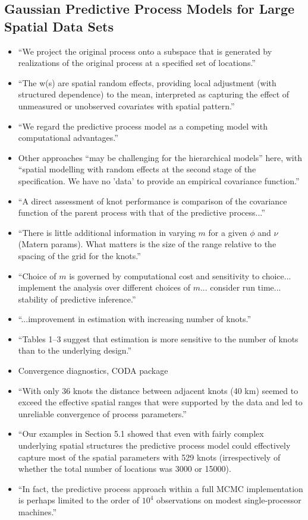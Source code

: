 \documentclass{article}
\begin{document}
\subsection*{Gaussian Predictive Process Models for Large Spatial Data Sets}
\citep{Banerjee2008}
\begin{itemize}
\item ``We project the original process onto a subspace that is generated by realizations of the original process at a specified set of locations.''
\item ``The w(s) are spatial random effects, providing local adjustment (with structured dependence) to the mean, interpreted as capturing the effect of unmeasured or unobserved covariates with spatial pattern.''
\item ``We regard the predictive process model as a competing model with computational advantages.''
\item Other approaches ``may be challenging for the hierarchical models'' here, with ``spatial modelling with random effects at the second stage of the specification. We have no 'data' to provide an empirical covariance function.''
\item ``A direct assessment of knot performance is comparison of the covariance function of the parent process with that of the predictive process...''
\item ``There is little additional information in varying $m$ for a given $\phi$ and $\nu$ (Matern params). What matters is the size of the range relative to the spacing of the grid for the knots.''
\item ``Choice of $m$ is governed by computational cost and sensitivity to choice... implement the analysis over different choices of $m$... consider run time... stability of predictive inference.''
\item ``...improvement in estimation with increasing number of knots.''
\item ``Tables 1--3 suggest that estimation is more sensitive to the number of knots than to the underlying design.''
\item Convergence diagnostics, CODA package
\item ``With only 36 knots the distance between adjacent knots (40 km) seemed to exceed the effective spatial ranges that were supported by the data and led to unreliable convergence of process parameters.''
\item ``Our examples in Section 5.1 showed that even with fairly complex underlying spatial structures the predictive process model could effectively capture most of the spatial parameters with 529 knots (irrespectively of whether the total number of locations was 3000 or 15000).
\item ``In fact, the predictive process approach within a full MCMC implementation is perhaps limited to the order of $10^{4}$ observations on modest single-processor machines.''
\end{itemize}
\end{document}
